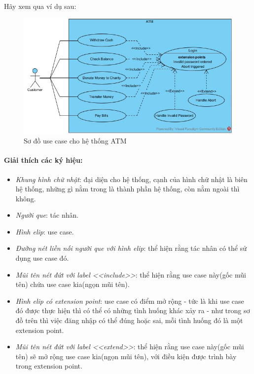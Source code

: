 \documentclass{article}
\begin{document}
  Hãy xem qua ví dụ sau:

  \begin{figure}[!ht]
    \centering
    \includegraphics[scale=0.6]{../pictures/diagrams/usecase/usecase-diagram-example.jpg}
    \caption{Sơ đồ use case cho hệ thống ATM}
  \end{figure}

  \paragraph{\textnormal{Giải thích các ký hiệu:}}
  \begin{itemize}
    \item \textit{Khung hình chữ nhật}: đại diện cho hệ thống, cạnh của hình chữ nhật là biên hệ thống, những gì nằm trong là thành phần hệ thống, còn nằm ngoài thì không.
    \item \textit{Người que}: tác nhân.
    \item \textit{Hình elip}: use case.
    \item \textit{Đường nét liền nối người que với hình elip}: thể hiện rằng tác nhân có thể sử dụng use case đó.
    \item \textit{Mũi tên nét đứt với label <<include>>}: thể  hiện rằng use case này(gốc mũi tên) chứa use case kia(ngọn mũi tên).
    \item \textit{Hình elip có extension point}: use case có điểm mở rộng - tức là khi use case đó được thực hiện thì có thể có những tình huống khác xảy ra - như trong sơ đồ trên thì việc đăng nhập có thể đúng hoặc sai, mỗi tình huống đó là một extension point.
    \item \textit{Mũi tên nét đứt với label <<extend>>}: thể hiện rằng use case này(gốc mũi tên) sẽ mở rộng use case kia(ngọn mũi tên), với điều kiện được trình bày trong extension point.
  \end{itemize}
\end{document}
